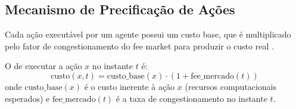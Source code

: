 \subsection{Mecanismo de Precificação de Ações}

Cada ação executável por um agente possui um custo base, que é
multiplicado pelo fator de congestionamento do fee market para
produzir o custo real \cite{opencode2026token}.

\begin{definicao}
O  de executar a ação $x$ no instante $t$ é:
\[
\text{custo}(x, t) = \text{custo\_base}(x) \cdot
(1 + \text{fee\_mercado}(t))
\]
onde $\text{custo\_base}(x)$ é o custo inerente à ação $x$
(recursos computacionais esperados) e $\text{fee\_mercado}(t)$
é a taxa de congestionamento no instante $t$.
\end{definicao}

